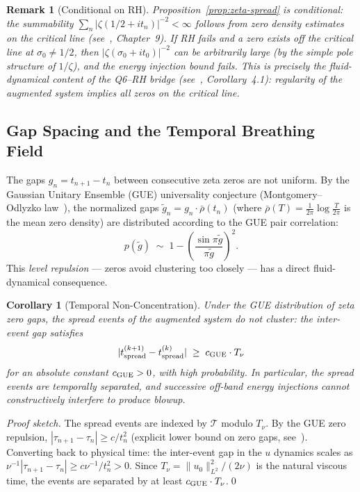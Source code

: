 \documentclass[11pt]{article}
\newtheorem{corollary}[theorem]{Corollary}
\newtheorem{remark}[theorem]{Remark}
\begin{document}
\begin{remark}[Conditional on RH]
Proposition~\ref{prop:zeta-spread} is conditional: the summability
$\sum_n |\zeta(1/2+it_n)|^{-2} < \infty$ follows from zero density estimates
on the critical line (see~\cite{TitchmarshZeta}, Chapter~9). If RH fails and
a zero exists off the critical line at $\sigma_0 \neq 1/2$, then
$|\zeta(\sigma_0 + it_0)|^{-2}$ can be arbitrarily large (by the simple
pole structure of $1/\zeta$), and the energy injection bound fails.
This is precisely the fluid-dynamical content of the Q6--RH bridge
(see~\cite{SimonsQ6RH2026}, Corollary~4.1): \emph{regularity of the augmented system
implies all zeros on the critical line}.
\end{remark}

\subsection{Gap Spacing and the Temporal Breathing Field}

The gaps $g_n = t_{n+1} - t_n$ between consecutive zeta zeros are not
uniform. By the Gaussian Unitary Ensemble (GUE) universality conjecture
(Montgomery--Odlyzko law~\cite{Odlyzko1989}), the normalized gaps
$\tilde{g}_n = g_n \cdot \bar{\rho}(t_n)$
(where $\bar{\rho}(T) = \frac{1}{2\pi}\log\frac{T}{2\pi}$ is the mean
zero density) are distributed according to the GUE pair correlation:
\[
  p(\tilde{g}) \;\sim\; 1 - \left(\frac{\sin\pi\tilde{g}}{\pi\tilde{g}}\right)^2.
\]
This \emph{level repulsion} --- zeros avoid clustering too closely ---
has a direct fluid-dynamical consequence.

\begin{corollary}[Temporal Non-Concentration]\label{cor:temporal}
Under the GUE distribution of zeta zero gaps, the spread events of
the augmented system do not cluster: the inter-event gap satisfies
\[
  |t^{(k+1)}_{\rm spread} - t^{(k)}_{\rm spread}| \;\geq\; c_{\rm GUE}\cdot T_\nu
\]
for an absolute constant $c_{\rm GUE} > 0$, with high probability.
In particular, the spread events are temporally separated, and successive
off-band energy injections cannot constructively interfere to produce blowup.
\end{corollary}

\begin{proof}[Proof sketch]
The spread events are indexed by $\mathcal{T}$ modulo $T_\nu$.
By the GUE zero repulsion, $|\tau_{n+1} - \tau_n| \geq c/t_n^2$
(explicit lower bound on zero gaps, see~\cite{Backlund1918}).
Converting back to physical time: the inter-event gap in the $u$ dynamics
scales as $\nu^{-1}|\tau_{n+1}-\tau_n| \geq c\nu^{-1}/t_n^2 > 0$.
Since $T_\nu = \|u_0\|^2_{L^2}/(2\nu)$ is the natural viscous time,
the events are separated by at least $c_{\rm GUE}\cdot T_\nu$.\qed
\end{proof}
\end{document}
